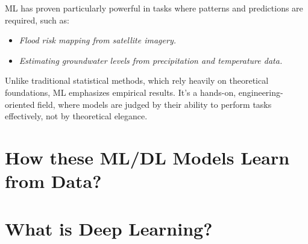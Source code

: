 ML has proven particularly powerful in tasks where patterns and predictions are required, such as:
\begin{itemize}
    \item \textit{Flood risk mapping from satellite imagery.}
    \item \textit{Estimating groundwater levels from precipitation and temperature data.}
\end{itemize}

Unlike traditional statistical methods, which rely heavily on theoretical foundations, ML emphasizes empirical results. It's a hands-on, engineering-oriented field, where models are judged by their ability to perform tasks effectively, not by theoretical elegance.

\section{How these ML/DL Models Learn from Data?}

\section{What is Deep Learning?}
\subsection{}